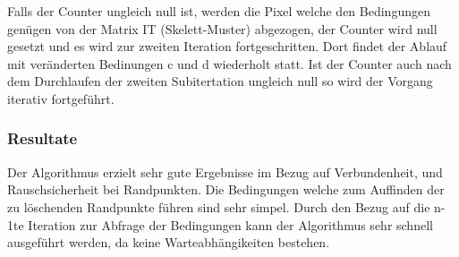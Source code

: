 Falls der Counter ungleich null ist, werden die Pixel welche den Bedingungen genügen von der Matrix IT (Skelett-Muster) abgezogen, der Counter wird null gesetzt und es wird zur zweiten Iteration fortgeschritten. Dort findet der Ablauf mit veränderten Bedinungen c und d wiederholt statt. Ist der Counter auch nach dem Durchlaufen der zweiten Subitertation ungleich null so wird der Vorgang iterativ fortgeführt.\\
\subsubsection{Resultate}

Der Algorithmus erzielt sehr gute Ergebnisse im Bezug auf Verbundenheit, und Rauschsicherheit bei Randpunkten. Die Bedingungen welche zum Auffinden der zu löschenden Randpunkte führen sind sehr simpel. Durch den Bezug auf die n-1te Iteration zur Abfrage der Bedingungen kann der Algorithmus sehr schnell ausgeführt werden, da keine Warteabhängikeiten bestehen.

\newpage
